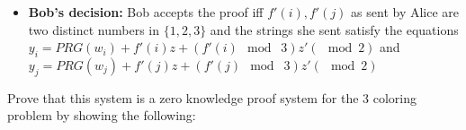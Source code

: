 \documentclass{article}
\begin{document}
\begin{enumerate}[noitemsep,topsep=\mdcompacttopsep,start=2]
\begin{itemize}
\item{}
\textbf{Bob's decision:} Bob accepts the proof iff $f'(i),f'(j)$ as sent by Alice are two distinct numbers in $\{1,2,3\}$ and the strings she sent satisfy the equations $y_i = PRG(w_i)+f'(i)z +(f'(i) \mod\; 3)z' (\mod 2)$  and $y_j = PRG(w_j)+f'(j)z +(f'(j) \mod\; 3)z' (\mod 2)$%
\end{itemize}%
\end{enumerate}%

\noindent{}Prove that this system is a zero knowledge proof system for the 3 coloring problem by showing the following:%

\end{document}
